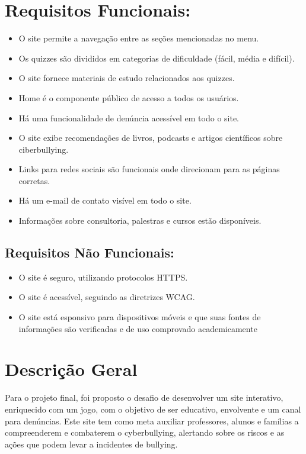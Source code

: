 \section{Requisitos Funcionais:}
\begin{itemize}
  \item O site permite a navegação entre as seções mencionadas no menu.
  \item  Os quizzes são divididos em categorias de dificuldade (fácil, média e difícil).
  \item O site fornece materiais de estudo relacionados aos quizzes.
   \item Home é o componente público de acesso a todos os usuários.
   \item Há uma funcionalidade de denúncia acessível em todo o site.
   \item O site exibe recomendações de livros, podcasts e artigos científicos sobre ciberbullying.
   \item  Links para redes sociais são funcionais onde direcionam para as páginas corretas.
\item Há um e-mail de contato visível em todo o site.
\item Informações sobre consultoria, palestras e cursos estão disponíveis.
\end{itemize}

\label{sec:tech}


\subsection{Requisitos Não Funcionais:}
\begin{itemize}
\item O site é seguro, utilizando protocolos HTTPS.
\item O site é acessível, seguindo as diretrizes WCAG. 
\item O site está esponsivo para dispositivos móveis e que suas fontes de informações são verificadas e de uso comprovado academicamente
\end{itemize}
\clearpage

\section{Descrição Geral}
\label{sec:descricao}
Para o projeto final, foi proposto o desafio de desenvolver um site interativo, enriquecido com um jogo, com o objetivo de ser educativo, envolvente e um canal para denúncias. Este site tem como meta auxiliar professores, alunos e famílias a compreenderem e combaterem o cyberbullying, alertando sobre os riscos e as ações que podem levar a incidentes de bullying. \\

